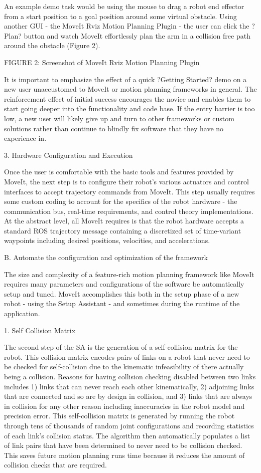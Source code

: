 \documentclass[10pt,journal,compsoc]{joser1}
\begin{document}
{An example demo task would be using the mouse to drag a robot end effector from a start position to a goal position around some virtual obstacle. Using another GUI - the MoveIt Rviz Motion Planning Plugin - the user can click the ?Plan? button and watch MoveIt effortlessly plan the arm in a collision free path around the obstacle (Figure 2).

FIGURE 2: Screenshot of MoveIt Rviz Motion Planning Plugin

It is important to emphasize the effect of a quick ?Getting Started? demo on a new user unaccustomed to MoveIt or motion planning frameworks in general. The reinforcement effect of initial success encourages the novice and enables them to start going deeper into the functionality and code base. If the entry barrier is too low, a new user will likely give up and turn to other frameworks or custom solutions rather than continue to blindly fix software that they have no experience in.

3. Hardware Configuration and Execution

Once the user is comfortable with the basic tools and features provided by MoveIt, the next step is to configure their robot's various actuators and control interfaces to accept trajectory commands from MoveIt. This step usually requires some custom coding to account for the specifics of the robot hardware - the communication bus, real-time requirements, and control theory implementations. At the abstract level, all MoveIt requires is that the robot hardware accepts a standard ROS trajectory message containing a discretized set of time-variant waypoints including desired positions, velocities, and accelerations. 

B. Automate the configuration and optimization of the framework

The size and complexity of a feature-rich motion planning framework like MoveIt requires many parameters and configurations of the software be automatically setup and tuned. MoveIt accomplishes this both in the setup phase of a new robot - using the Setup Assistant - and sometimes during the runtime of the application.

1. Self Collision Matrix

The second step of the SA is the generation of a self-collision matrix for the robot. This collision matrix encodes pairs of links on a robot that never need to be checked for self-collision due to the kinematic infeasibility of there actually being a collision. Reasons for having collision checking disabled between two links includes 1) links that can never reach each other kinematically, 2) adjoining links that are connected and so are by design in collision, and 3) links that are always in collision for any other reason including inaccuracies in the robot model and precision error. This self-collision matrix is generated by running the robot through tens of thousands of random joint configurations and recording statistics of each link's collision status. The algorithm then automatically populates a list of link pairs that have been determined to never need to be collision checked. This saves future motion planning runs time because it reduces the amount of collision checks that are required.

}
\end{document}
